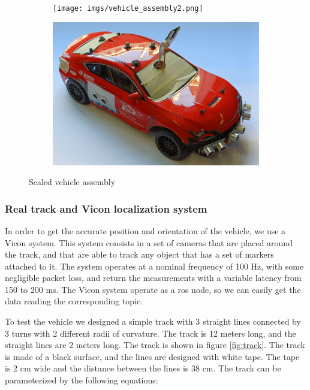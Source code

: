 \documentclass[a4paper,12pt,sort&compress]{article}
\begin{document}
    \begin{figure}
        \centering
        \begin{subfigure}[c]{\textwidth}
            \centering
            \texttt{[image: imgs/vehicle\_assembly2.png]}
        \end{subfigure}
        \begin{subfigure}[c]{\textwidth}
            \centering
            \includegraphics[width=\textwidth]{imgs/chassis.jpg}
        \end{subfigure}
        \caption{Scaled vehicle assembly}
        \label{fig:vehicle_assembly}
    \end{figure}
    
\subsubsection*{Real track and Vicon localization system}
    In order to get the accurate position and orientation of the vehicle, we use a Vicon system.
    This system consists in a set of cameras that are placed around the track, and that are able to
    track any object that has a set of markers attached to it. The system operates at a nominal
    frequency of 100 Hz, with some negligible packet loss, and return the measurements with a variable
    latency from 150 to 200 ms. The Vicon system operate as a ros node, so we can easily get the
    data reading the corresponding topic. 
    
    To test the vehicle we designed a simple track with 3 straight lines connected by 3 turns with 2
    different radii of curvature. The track is 12 meters long, and the straight lines are 2 meters
    long. The track is shown in figure \ref{fig:track}. The track is made of a black surface, and
    the lines are designed with white tape. The tape is 2 cm wide and the distance between the lines
    is 38 cm. The track can be parameterized by the following equations:
    
\end{document}
